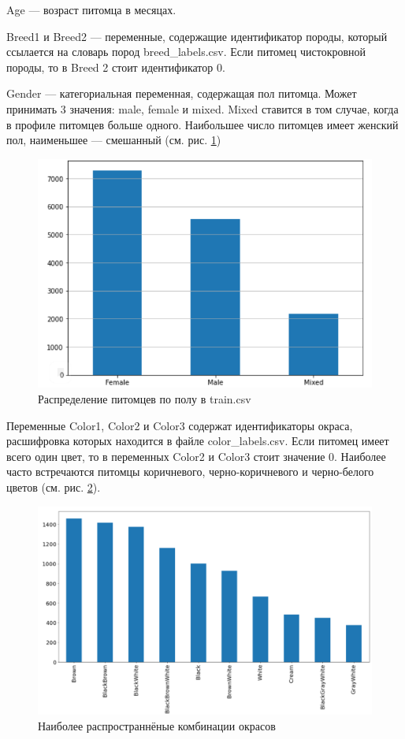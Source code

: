 \documentclass[14pt]{mmcs_article}
\begin{document}
Age --- возраст питомца в месяцах.

Breed1 и Breed2 --- переменные, содержащие идентификатор породы, который ссылается на словарь пород breed\_labels.csv. Если питомец чистокровной породы, то в Breed 2 стоит идентификатор 0.

Gender --- категориальная переменная, содержащая пол питомца. Может принимать 3 значения: male, female и mixed. Mixed ставится в том случае, когда в профиле питомцев больше одного. Наибольшее число питомцев имеет женский пол, наименьшее — смешанный (см. рис. \ref{analyse:gender})

\begin{figure}[H]
	\centering
	\includegraphics[scale=0.8]{gender.png}
	\caption{Распределение питомцев по полу в train.csv}\label{analyse:gender}
\end{figure}

Переменные Color1, Color2 и Color3 содержат идентификаторы окраса, расшифровка которых находится в файле color\_labels.csv. Если питомец имеет всего один цвет, то в переменных Color2 и Color3 стоит значение 0. Наиболее часто встречаются питомцы коричневого, черно-коричневого и черно-белого цветов (см. рис. \ref{analyse:color}).

\begin{figure}[H]
	\centering
	\includegraphics[scale=0.5]{color.png}
	\caption{Наиболее распространнёные комбинации окрасов}\label{analyse:color}
\end{figure}
\end{document}
